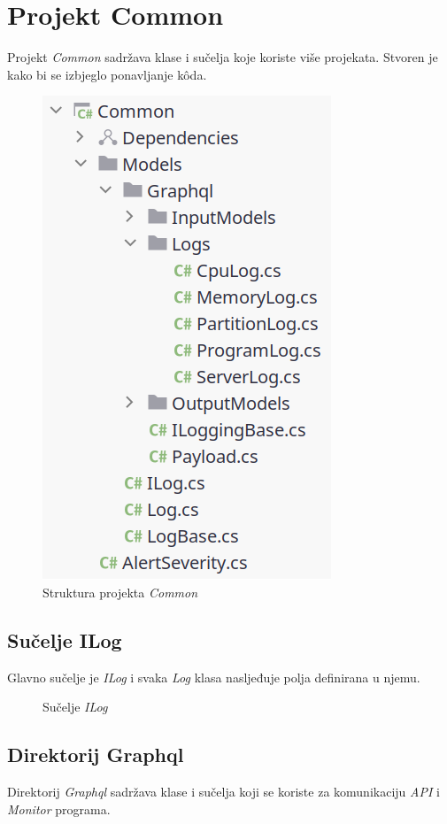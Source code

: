 \documentclass[zavrsnirad]{fer}
\begin{document}
\section{Projekt Common}
Projekt \textit{Common} sadržava klase i sučelja koje koriste više projekata. Stvoren je kako bi se izbjeglo ponavljanje kôda.
\begin{figure}[htb!]
	\centering
	\includegraphics[width=0.4\linewidth]{images/common_structure.png} 
	\caption{Struktura projekta \textit{Common}}
	\label{slk:common_structure.png}
\end{figure}
\FloatBarrier

\subsection{Sučelje ILog}
Glavno sučelje je \textit{ILog} i svaka \textit{Log} klasa nasljeđuje polja definirana u njemu.
\begin{figure}[htb]
	\centering
	
	\caption{Sučelje \textit{ILog}}
\end{figure}
\FloatBarrier

\subsection{Direktorij Graphql}
Direktorij \textit{Graphql} sadržava klase i sučelja koji se koriste za komunikaciju \textit{API} i \textit{Monitor} programa.
\end{document}

